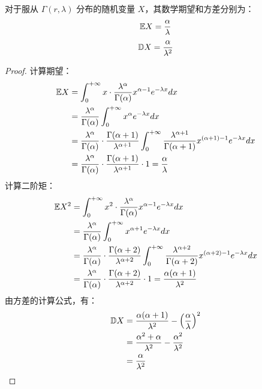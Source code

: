 \begin{proposition} \label{prop:gamma_expectation_variance}
对于服从 $\Gamma(r,\lambda)$ 分布的随机变量 $X$，其数学期望和方差分别为：
\[
\mathbb{E} X = \frac{\alpha}{\lambda}
\]
\[
\mathbb{D} X = \frac{\alpha}{\lambda^2}
\]
\end{proposition}

\begin{proof}
计算期望：
\begin{align*}
\mathbb{E} X &= \int_0^{+\infty} x \cdot \frac{\lambda^\alpha}{\Gamma(\alpha)}x^{\alpha-1}e^{-\lambda x} dx \\
&= \frac{\lambda^\alpha}{\Gamma(\alpha)} \int_0^{+\infty} x^\alpha e^{-\lambda x} dx \\
&= \frac{\lambda^\alpha}{\Gamma(\alpha)} \cdot \frac{\Gamma(\alpha+1)}{\lambda^{\alpha+1}} \int_0^{+\infty} \frac{\lambda^{\alpha+1}}{\Gamma(\alpha+1)} x^{(\alpha+1)-1} e^{-\lambda x} dx \\
&= \frac{\lambda^\alpha}{\Gamma(\alpha)} \cdot \frac{\Gamma(\alpha+1)}{\lambda^{\alpha+1}} \cdot 1
= \frac{\alpha}{\lambda}
\end{align*}
计算二阶矩：
\begin{align*}
\mathbb{E} X^2 &= \int_0^{+\infty} x^2 \cdot \frac{\lambda^\alpha}{\Gamma(\alpha)}x^{\alpha-1}e^{-\lambda x} dx \\
&= \frac{\lambda^\alpha}{\Gamma(\alpha)} \int_0^{+\infty} x^{\alpha+1} e^{-\lambda x} dx \\
&= \frac{\lambda^\alpha}{\Gamma(\alpha)} \cdot \frac{\Gamma(\alpha+2)}{\lambda^{\alpha+2}} \int_0^{+\infty} \frac{\lambda^{\alpha+2}}{\Gamma(\alpha+2)} x^{(\alpha+2)-1} e^{-\lambda x} dx \\
&= \frac{\lambda^\alpha}{\Gamma(\alpha)} \cdot \frac{\Gamma(\alpha+2)}{\lambda^{\alpha+2}} \cdot 1 = \frac{\alpha(\alpha+1)}{\lambda^2}
\end{align*}
由方差的计算公式，有：
\begin{align*}
\mathbb{D} X &= \frac{\alpha(\alpha+1)}{\lambda^2} - \left(\frac{\alpha}{\lambda}\right)^2 \\
&= \frac{\alpha^2+\alpha}{\lambda^2} - \frac{\alpha^2}{\lambda^2} \\
&= \frac{\alpha}{\lambda^2}
\end{align*}
\end{proof}
 